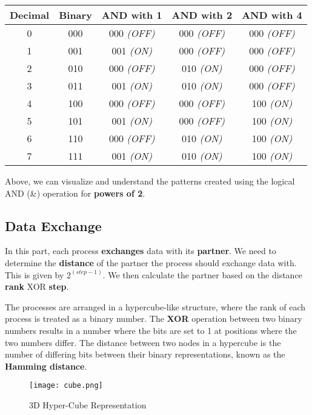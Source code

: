 \documentclass[12pt]{report}
\begin{document}
\vspace{1cm}
\begin{tabular}{|c|c|c|c|c|}
    \hline
    \textbf{Decimal} & \textbf{Binary} & \textbf{AND with 1} & \textbf{AND with 2} & \textbf{AND with 4} \\ \hline
    0 & 000 & 000 \textit{(OFF)}& 000 \textit{(OFF)}& 000 \textit{(OFF)}\\ \hline
    1 & 001 & 001 \textit{(ON)}& 000 \textit{(OFF)}& 000 \textit{(OFF)}\\ \hline
    2 & 010 & 000 \textit{(OFF)}& 010 \textit{(ON)}& 000 \textit{(OFF)}\\ \hline
    3 & 011 & 001 \textit{(ON)}& 010 \textit{(ON)}& 000 \textit{(OFF)}\\ \hline
    4 & 100 & 000 \textit{(OFF)}& 000 \textit{(OFF)}& 100 \textit{(ON)}\\ \hline
    5 & 101 & 001 \textit{(ON)}& 000 \textit{(OFF)}& 100 \textit{(ON)}\\ \hline
    6 & 110 & 000 \textit{(OFF)}& 010 \textit{(ON)}& 100 \textit{(ON)}\\ \hline
    7 & 111 & 001 \textit{(ON)}& 010 \textit{(ON)}& 100 \textit{(ON)}\\ \hline
\end{tabular}
\vspace{1cm}

Above, we can visualize and understand the patterns created using the logical AND ({\&}) operation for \textbf{powers of 2}.

\subsection{Data Exchange}

In this part, each process \textbf{exchanges} data with its \textbf{partner}. We need to determine the \textbf{distance} of the partner the process should exchange data with. This is given by $2^{(step-1)}$.  We then calculate the partner based on the distance \textbf{rank} XOR \textbf{step}.

The processes are arranged in a hypercube-like structure, where the rank of each process is treated as a binary number. The \textbf{XOR} operation between two binary numbers results in a number where the bits are set to 1 at positions where the two numbers differ. The distance between two nodes in a hypercube is the number of differing bits between their binary representations, known as the \textbf{Hamming distance}. 

\begin{figure}[H]
    \centering
    \texttt{[image: cube.png]}
    \caption{3D Hyper-Cube Representation}
    \label{fig:enter-label}
\end{figure}
\end{document}
